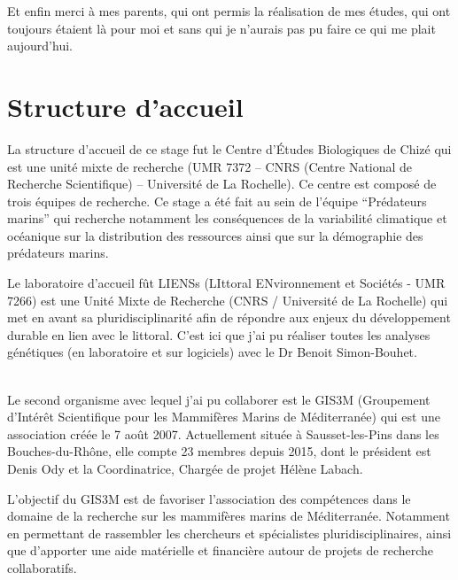 \documentclass[a4paper,12pt,twoside]{article}\usepackage[]{graphicx}\usepackage[]{color}
\begin{document}
Et enfin merci à mes parents, qui ont permis la réalisation de mes études, qui ont toujours étaient là pour moi et sans qui je n'aurais pas pu faire ce qui me plait aujourd'hui.

\newpage
\mainmatter

\tableofcontents


\newpage
\listoffigures  %
\listoftables   %

\newpage


 \setcounter{page}{1}

\part*{Structure d'accueil}


La structure d'accueil de ce stage fut le Centre d’Études Biologiques de Chizé qui est une unité mixte de recherche (UMR 7372 – CNRS (Centre National de Recherche Scientifique) – Université de La Rochelle). Ce centre est composé de trois équipes de recherche. Ce stage a été fait au sein de l’équipe ``Prédateurs marins'' qui recherche notamment les conséquences de la variabilité climatique et océanique sur la distribution des ressources ainsi que sur la démographie des prédateurs marins.

Le laboratoire d'accueil fût LIENSs (LIttoral ENvironnement et Sociétés - UMR 7266) est une Unité Mixte de Recherche (CNRS / Université de La Rochelle) qui met en avant sa pluridisciplinarité afin de répondre aux enjeux du développement durable en lien avec le littoral. C'est ici que j'ai pu réaliser toutes les analyses génétiques (en laboratoire et sur logiciels) avec le Dr Benoit Simon-Bouhet.

~~\\

Le second organisme avec lequel j'ai pu collaborer est le GIS3M (Groupement d’Intérêt Scientifique pour les Mammifères Marins de Méditerranée) qui est une association créée le 7 août 2007. Actuellement située à Sausset-les-Pins dans les Bouches-du-Rhône, elle compte 23 membres depuis 2015, dont le président est Denis Ody et la Coordinatrice, Chargée de projet Hélène Labach.

L’objectif du GIS3M est de favoriser l'association des compétences dans le domaine de la recherche sur les mammifères marins de Méditerranée. Notamment en permettant de rassembler les chercheurs et spécialistes pluridisciplinaires, ainsi que d'apporter une aide matérielle et financière autour de projets de recherche collaboratifs.
\end{document}
